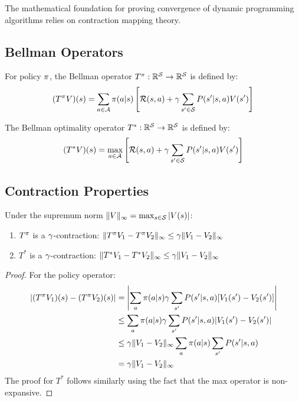The mathematical foundation for proving convergence of dynamic programming algorithms relies on contraction mapping theory.

\subsection{Bellman Operators}

\begin{definition}
For policy $\pi$, the Bellman operator $T^\pi: \mathbb{R}^{\mathcal{S}} \to \mathbb{R}^{\mathcal{S}}$ is defined by:
\begin{equation}
(T^\pi V)(s) = \sum_{a \in \mathcal{A}} \pi(a|s) \left[\mathcal{R}(s,a) + \gamma \sum_{s' \in \mathcal{S}} P(s'|s,a) V(s')\right]
\end{equation}
\end{definition}

\begin{definition}
The Bellman optimality operator $T^*: \mathbb{R}^{\mathcal{S}} \to \mathbb{R}^{\mathcal{S}}$ is defined by:
\begin{equation}
(T^* V)(s) = \max_{a \in \mathcal{A}} \left[\mathcal{R}(s,a) + \gamma \sum_{s' \in \mathcal{S}} P(s'|s,a) V(s')\right]
\end{equation}
\end{definition}

\subsection{Contraction Properties}

\begin{theorem}
Under the supremum norm $\|V\|_\infty = \max_{s \in \mathcal{S}} |V(s)|$:
\begin{enumerate}
    \item $T^\pi$ is a $\gamma$-contraction: $\|T^\pi V_1 - T^\pi V_2\|_\infty \leq \gamma \|V_1 - V_2\|_\infty$
    \item $T^*$ is a $\gamma$-contraction: $\|T^* V_1 - T^* V_2\|_\infty \leq \gamma \|V_1 - V_2\|_\infty$
\end{enumerate}
\end{theorem}

\begin{proof}
For the policy operator:
\begin{align}
|(T^\pi V_1)(s) - (T^\pi V_2)(s)| &= \left|\sum_{a} \pi(a|s) \gamma \sum_{s'} P(s'|s,a) [V_1(s') - V_2(s')]\right| \\
&\leq \sum_{a} \pi(a|s) \gamma \sum_{s'} P(s'|s,a) |V_1(s') - V_2(s')| \\
&\leq \gamma \|V_1 - V_2\|_\infty \sum_{a} \pi(a|s) \sum_{s'} P(s'|s,a) \\
&= \gamma \|V_1 - V_2\|_\infty
\end{align}
The proof for $T^*$ follows similarly using the fact that the max operator is non-expansive.
\end{proof}

